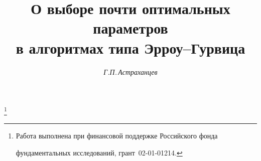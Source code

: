 

 




 


\newcommand{\A}{\mathrm a} 


\newcommand{\re}{\operatorname{Re}} 


\newcommand{\im}{\operatorname{Im}} 


\newcommand{\tts}[1]{} 




 




 


\setcounter{page}{12} 












 


\author{\it Г.П.\,Астраханцев} 




\title{О выборе почти оптимальных параметров \\


в алгоритмах типа Эрроу--Гурвица} 


\thanks{Работа выполнена при финансовой поддержке Российского фонда 


фундаментальных исследований, грант \No\,02-01-01214.} 


 


\date{} 




